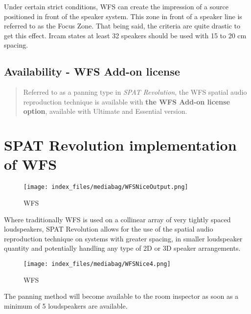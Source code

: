 \documentclass[
  letterpaper,
  DIV=11,
  numbers=noendperiod]{scrreport}
\begin{document}
Under certain strict conditions, WFS can create the impression of a
source positioned in front of the speaker system. This zone in front of
a speaker line is referred to as the Focus Zone. That being said, the
criteria are quite drastic to get this effect. Ircam states at least 32
speakers should be used with 15 to 20 cm spacing.

\hypertarget{availability---wfs-add-on-license}{%
\subsection{Availability - WFS Add-on
license}\label{availability---wfs-add-on-license}}

\begin{quote}
Referred to as a panning type in \emph{SPAT Revolution}, the WFS spatial
audio reproduction technique is available with \textbf{the WFS Add-on
license option}, available with Ultimate and Essential version.
\end{quote}

\hypertarget{spat-revolution-implementation-of-wfs}{%
\section{SPAT Revolution implementation of
WFS}\label{spat-revolution-implementation-of-wfs}}

\begin{figure}

{\centering \texttt{[image: index\_files/mediabag/WFSNiceOutput.png]}

}

\caption{WFS}

\end{figure}

Where traditionally WFS is used on a collinear array of very tightly
spaced loudspeakers, SPAT Revolution allows for the use of the spatial
audio reproduction technique on systems with greater spacing, in smaller
loudspeaker quantity and potentially handling any type of 2D or 3D
speaker arrangements.

\begin{figure}

{\centering \texttt{[image: index\_files/mediabag/WFSNice4.png]}

}

\caption{WFS}

\end{figure}

The panning method will become available to the room inspector as soon
as a minimum of 5 loudspeakers are available.
\end{document}
